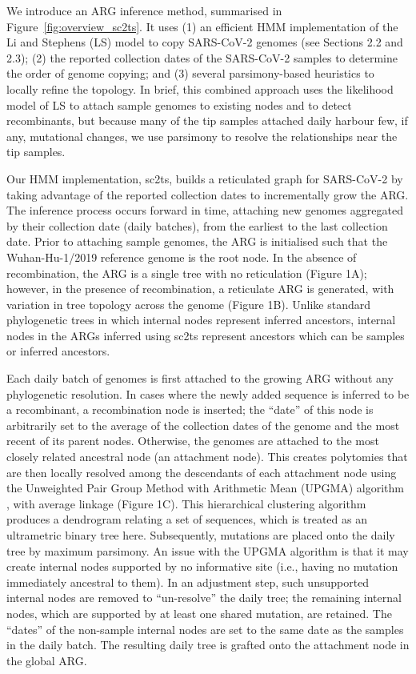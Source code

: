 \documentclass{article}
\begin{document}
We introduce an ARG inference method, summarised in
Figure~\ref{fig:overview_sc2ts}.
It uses (1) an
efficient HMM implementation of the Li and Stephens (LS) model \citep{Li2003-ib}
to copy SARS-CoV-2 genomes (see Sections 2.2 and 2.3); (2) the reported
collection dates of the SARS-CoV-2 samples to determine the order of genome
copying; and (3) several parsimony-based heuristics to locally refine the
topology. In brief, this combined approach uses the likelihood model of LS to
attach sample genomes to existing nodes and to detect recombinants, but because
many of the tip samples attached daily harbour few, if any, mutational changes,
we use parsimony to resolve the relationships near the tip samples.

Our HMM implementation, sc2ts, builds a reticulated graph for SARS-CoV-2 by
taking advantage of the reported collection dates to incrementally grow the
ARG. The inference process occurs forward in time, attaching new genomes
aggregated by their collection date (daily batches), from the earliest to the
last collection date. Prior to attaching sample genomes, the ARG is initialised
such that the Wuhan-Hu-1/2019 reference genome is the root node. In the absence
of recombination, the ARG is a single tree with no reticulation (Figure 1A);
however, in the presence of recombination, a reticulate ARG is generated, with
variation in tree topology across the genome (Figure 1B). Unlike standard
phylogenetic trees in which internal nodes represent inferred ancestors,
internal nodes in the ARGs inferred using sc2ts represent ancestors which can
be samples or inferred ancestors.

Each daily batch of genomes is first attached to the growing ARG without any
phylogenetic resolution. In cases where the newly added sequence is inferred to
be a recombinant, a recombination node is inserted; the ``date'' of this node is
arbitrarily set to the average of the collection dates of the genome and the
most recent of its parent nodes. Otherwise, the genomes are attached to the
most closely related ancestral node (an attachment node). This creates
polytomies that are then locally resolved among the descendants of each
attachment node using the Unweighted Pair Group Method with Arithmetic Mean
(UPGMA) algorithm \citep{Michener1957-tr}, with average linkage (Figure 1C).
This hierarchical clustering algorithm produces a dendrogram relating a set of
sequences, which is treated as an ultrametric binary tree here. Subsequently,
mutations are placed onto the daily tree by maximum parsimony. An issue with
the UPGMA algorithm is that it may create internal nodes supported by no
informative site (i.e., having no mutation immediately ancestral to them). In
an adjustment step, such unsupported internal nodes are removed to ``un-resolve''
the daily tree; the remaining internal nodes, which are supported by at least
one shared mutation, are retained. The ``dates'' of the non-sample internal nodes
are set to the same date as the samples in the daily batch. The resulting daily
tree is grafted onto the attachment node in the global ARG.
\end{document}
